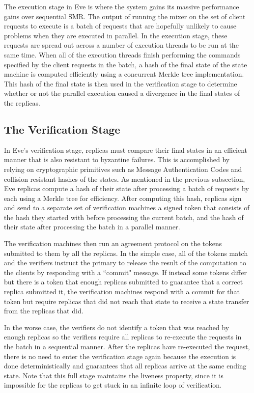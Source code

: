 \documentclass[11pt, oneside]{report}
\begin{document}
The execution stage in Eve is where the system gains its massive performance gains over sequential SMR. The output of running the mixer on the set of client requests to execute is a batch of requests that are hopefully unlikely to cause problems when they are executed in parallel. In the execution stage, these requests are spread out across a number of execution threads to be run at the same time. When all of the execution threads finish performing the commands specified by the client requests in the batch, a hash of the final state of the state machine is computed efficiently using a concurrent Merkle tree implementation. This hash of the final state is then used in the verification stage to determine whether or not the parallel execution caused a divergence in the final states of the replicas.

\subsection{The Verification Stage}
In Eve's verification stage, replicas must compare their final states in an efficient manner that is also resistant to byzantine failures. This is accomplished by relying on cryptographic primitives such as Message Authentication Codes and collision resistant hashes of the states. As mentioned in the previous subsection, Eve replicas compute a hash of their state after processing a batch of requests by each using a Merkle tree for efficiency. After computing this hash, replicas sign and send to a separate set of verification machines a signed token that consists of the hash they started with before processing the current batch, and the hash of their state after processing the batch in a parallel manner.

The verification machines then run an agreement protocol on the tokens submitted to them by all the replicas. In the simple case, all of the tokens match and the verifiers instruct the primary to release the result of the computation to the clients by responding with a ``commit" message. If instead some tokens differ but there is a token that enough replicas submitted to guarantee that a correct replica submitted it, the verification machines respond with a commit for that token but require replicas that did not reach that state to receive a state transfer from the replicas that did. 

In the worse case, the verifiers do not identify a token that was reached by enough replicas so the verifiers require all replicas to re-execute the requests in the batch in a sequential manner. After the replicas have re-executed the request, there is no need to enter the verification stage again because the execution is done deterministically and guarantees that all replicas arrive at the same ending state. Note that this full stage maintains the liveness property, since it is impossible for the replicas to get stuck in an infinite loop of verification.
\end{document}
